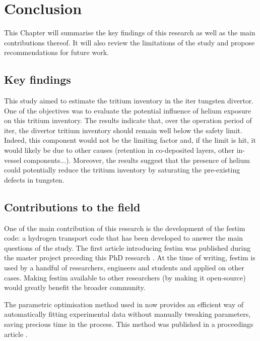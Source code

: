 \setchapterpreamble[u]{\margintoc}
\chapter{Conclusion}

This Chapter will summarise the key findings of this research as well as the main contributions thereof.
It will also review the limitations of the study and propose recommendations for future work.

\section*{Key findings}

This study aimed to estimate the tritium inventory in the \gls{iter} tungsten \gls{divertor}.
One of the objectives was to evaluate the potential influence of helium exposure on this tritium inventory.
The results indicate that, over the operation period of \gls{iter}, the \gls{divertor} tritium inventory should remain well below the safety limit.
Indeed, this component would not be the limiting factor and, if the limit is hit, it would likely be due to other causes (retention in co-deposited layers, other in-vessel components...).
Moreover, the results suggest that the presence of helium could potentially reduce the tritium inventory by saturating the pre-existing defects in tungsten.

\section*{Contributions to the field}
One of the main contribution of this research is the development of the \gls{festim} code: a hydrogen transport code that has been developed to answer the main questions of the study.
The first article introducing \gls{festim} was published during the master project preceding this PhD research \cite{delaporte-mathurin_finite_2019}.
At the time of writing, \gls{festim} is used by a handful of researchers, engineers and students and applied on other cases.
Making \gls{festim} available to other researchers (by making it open-source) would greatly benefit the broader community.

The parametric optimisation method used in  now provides an efficient way of automatically fitting experimental data without manually tweaking parameters, saving precious time in the process.
This method was published in a proceedings article \cite{delaporte-mathurin_parametric_2021}.

